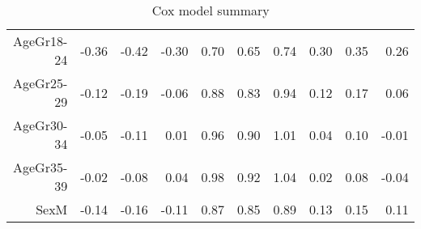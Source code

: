 \begin{table}[ht]
\begin{tabular}{rrrrrrrrrr}
  AgeGr18-24 & -0.36 & -0.42 & -0.30 & 0.70 & 0.65 & 0.74 & 0.30 & 0.35 & 0.26 \\ 
  AgeGr25-29 & -0.12 & -0.19 & -0.06 & 0.88 & 0.83 & 0.94 & 0.12 & 0.17 & 0.06 \\ 
  AgeGr30-34 & -0.05 & -0.11 & 0.01 & 0.96 & 0.90 & 1.01 & 0.04 & 0.10 & -0.01 \\ 
  AgeGr35-39 & -0.02 & -0.08 & 0.04 & 0.98 & 0.92 & 1.04 & 0.02 & 0.08 & -0.04 \\ 
  SexM & -0.14 & -0.16 & -0.11 & 0.87 & 0.85 & 0.89 & 0.13 & 0.15 & 0.11 \\ 
   \hline
\end{tabular}
\caption{Cox model summary} 
\end{table}
